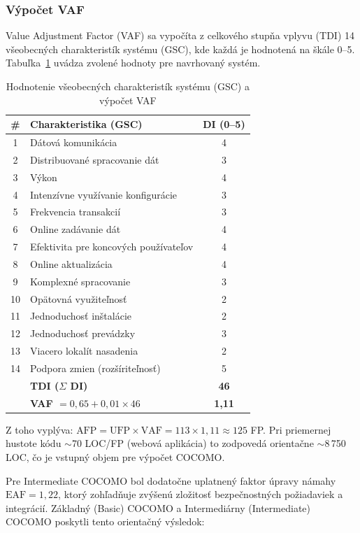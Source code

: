 \subsubsection*{Výpočet VAF}

Value Adjustment Factor (VAF) sa vypočíta z celkového stupňa vplyvu (TDI) 14 všeobecných charakteristík systému (GSC), kde každá je hodnotená na škále 0--5. Tabuľka~\ref{tab:vaf} uvádza zvolené hodnoty pre navrhovaný systém.

\begin{table}[htbp]
\centering
\caption{Hodnotenie všeobecných charakteristík systému (GSC) a výpočet VAF}
\label{tab:vaf}
\small
\begin{tabular}{c l c}
\toprule
\# & Charakteristika (GSC) & DI (0--5) \\
\midrule
1 & Dátová komunikácia & 4 \\
2 & Distribuované spracovanie dát & 3 \\
3 & Výkon & 4 \\
4 & Intenzívne využívanie konfigurácie & 3 \\
5 & Frekvencia transakcií & 3 \\
6 & Online zadávanie dát & 4 \\
7 & Efektivita pre koncových používateľov & 4 \\
8 & Online aktualizácia & 4 \\
9 & Komplexné spracovanie & 3 \\
10 & Opätovná využiteľnosť & 2 \\
11 & Jednoduchosť inštalácie & 2 \\
12 & Jednoduchosť prevádzky & 3 \\
13 & Viacero lokalít nasadenia & 2 \\
14 & Podpora zmien (rozšíriteľnosť) & 5 \\
\midrule
 & \textbf{TDI ($\Sigma$ DI)} & \textbf{46} \\
 & \textbf{VAF $= 0{,}65 + 0{,}01 \times 46$} & \textbf{1{,}11} \\
\bottomrule
\end{tabular}
\end{table}

Z toho vyplýva: $\text{AFP} = \text{UFP} \times \text{VAF} = 113 \times 1{,}11 \approx 125$ FP. Pri priemernej hustote kódu $\sim$70 LOC/FP (webová aplikácia) to zodpovedá orientačne $\sim$8\,750 LOC, čo je vstupný objem pre výpočet COCOMO.

Pre Intermediate COCOMO bol dodatočne uplatnený faktor úpravy námahy $\text{EAF} = 1{,}22$, ktorý zohľadňuje zvýšenú zložitosť bezpečnostných požiadaviek a integrácií. Základný (Basic) COCOMO a Intermediárny (Intermediate) COCOMO poskytli tento orientačný výsledok:


